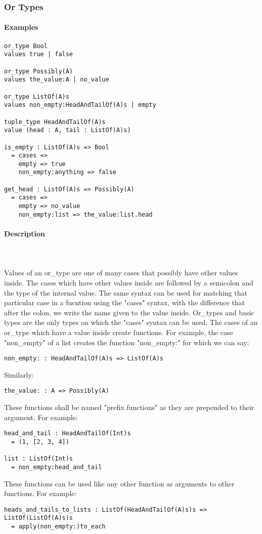 \documentclass{article}
\def\pend{\mbox{} \\\\}
\begin{document}
\subsubsection{Or Types}

\paragraph{Examples}

\begin{verbatim}
or_type Bool
values true | false

or_type Possibly(A)
values the_value:A | no_value

or_type ListOf(A)s
values non_empty:HeadAndTailOf(A)s | empty

tuple_type HeadAndTailOf(A)s
value (head : A, tail : ListOf(A)s)

is_empty : ListOf(A)s => Bool
  = cases => 
    empty => true
    non_empty:anything => false

get_head : ListOf(A)s => Possibly(A)
  = cases => 
    empty => no_value
    non_empty:list => the_value:list.head
\end{verbatim}

\paragraph{Description}\pend
Values of an or\_type are one of many cases that possibly have other values inside.
The cases which have other values inside are followed by a semicolon and the 
type of the internal value. The same syntax can be used for matching that particular 
case in a fucntion using the "cases" syntax, with the difference that after the
colon, we write the name given to the value inside. 
Or\_types and basic types are the only types on which
the "cases" syntax can be used. The cases of an or\_type which have a value
inside create functions. For example, the case "non\_empty" of a list creates the
function "non\_empty:" for which we can say:
\begin{verbatim}
non_empty: : HeadAndTailOf(A)s => ListOf(A)s
\end{verbatim}
Similarly:
\begin{verbatim}
the_value: : A => Possibly(A)
\end{verbatim}
These functions shall be named "prefix functions" as they are prepended to their
argument.
For example:
\begin{verbatim}
head_and_tail : HeadAndTailOf(Int)s
  = (1, [2, 3, 4])

list : ListOf(Int)s
  = non_empty:head_and_tail
\end{verbatim}
These functions can be used like any other function as arguments to other functions.
For example:
\begin{verbatim}
heads_and_tails_to_lists : ListOf(HeadAndTailOf(A)s)s => ListOf(ListOf(A)s)s
  = apply(non_empty:)to_each
\end{verbatim}
\end{document}

